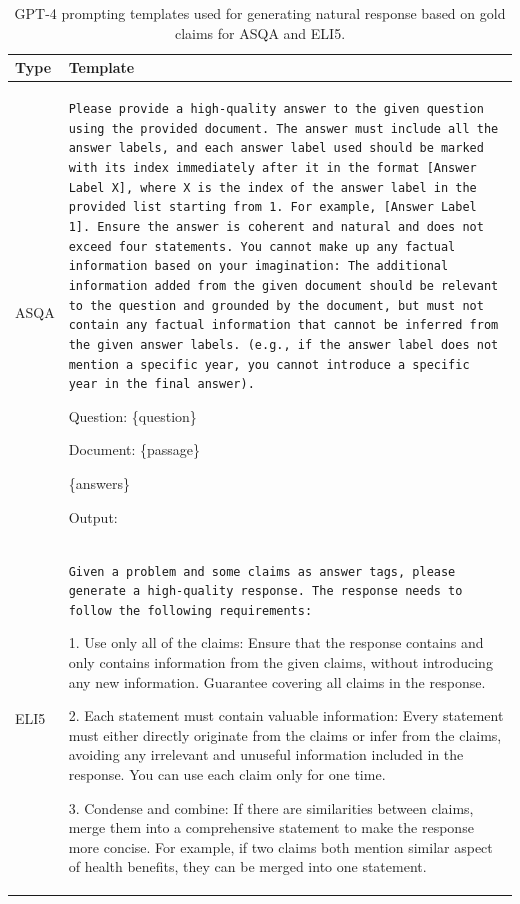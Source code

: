 \documentclass{article} %
\begin{document}
\begin{table}[htb!]
\caption{GPT-4 prompting templates used for generating natural response based on gold claims for ASQA and ELI5.}
\label{table: synthesis_template}
\centering
\begin{tabularx}{\linewidth}{p{1.0cm}<{\raggedright}X}
\toprule
\textbf{Type} & \textbf{Template} \\ 
\midrule
ASQA &  \tt Please provide a high-quality answer to the given question using the provided document. The answer must include all the answer labels, and each answer label used should be marked with its index immediately after it in the format [Answer Label X], where X is the index of the answer label in the provided list starting from 1. For example, [Answer Label 1].  Ensure the answer is coherent and natural and does not exceed four statements. You cannot make up any factual information based on your imagination: The additional information added from the given document should be relevant to the question and grounded by the document, but must not contain any factual information that cannot be inferred from the given answer labels. (e.g., if the answer label does not mention a specific year, you cannot introduce a specific year in the final answer).

    Question: \{question\}
    
    Document: \{passage\}
    
    \{answers\}
    
    Output:\\
\midrule
ELI5 & \tt Given a problem and some claims as answer tags, please generate a high-quality response. The response needs to follow the following requirements:

    1. Use only all of the claims: Ensure that the response contains and only contains information from the given claims, without introducing any new information. Guarantee covering all claims in the response.
    
    2. Each statement must contain valuable information: Every statement must either directly originate from the claims or infer from the claims, avoiding any irrelevant and unuseful information included in the response. You can use each claim only for one time.
    
    3. Condense and combine: If there are similarities between claims, merge them into a comprehensive statement to make the response more concise. For example, if two claims both mention similar aspect of health benefits, they can be merged into one statement.
    

\end{tabularx}
\end{table}
\end{document}
